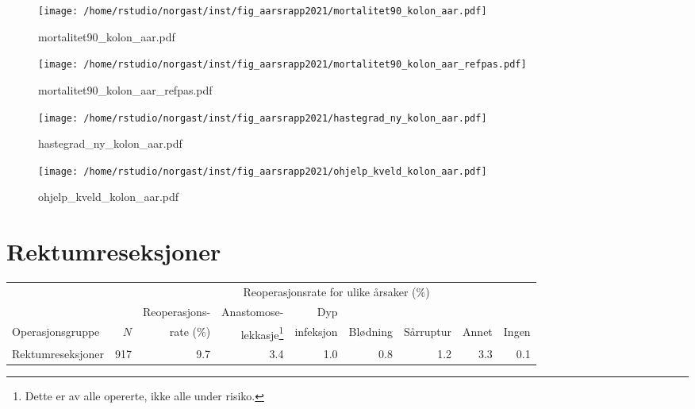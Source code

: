 \documentclass[norsk,a4paper]{article}\usepackage[]{graphicx}\usepackage[]{color}
\begin{document}
\begin{figure}[ht]
\centering
\texttt{[image: /home/rstudio/norgast/inst/fig\_aarsrapp2021/mortalitet90\_kolon\_aar.pdf]}
\caption{mortalitet90\_kolon\_aar.pdf}
\end{figure}

\begin{figure}[ht]
\centering
\texttt{[image: /home/rstudio/norgast/inst/fig\_aarsrapp2021/mortalitet90\_kolon\_aar\_refpas.pdf]}
\caption{mortalitet90\_kolon\_aar\_refpas.pdf}
\end{figure}

\begin{figure}[ht]
\centering
\texttt{[image: /home/rstudio/norgast/inst/fig\_aarsrapp2021/hastegrad\_ny\_kolon\_aar.pdf]}
\caption{hastegrad\_ny\_kolon\_aar.pdf}
\end{figure}

\begin{figure}[ht]
\centering
\texttt{[image: /home/rstudio/norgast/inst/fig\_aarsrapp2021/ohjelp\_kveld\_kolon\_aar.pdf]}
\caption{ohjelp\_kveld\_kolon\_aar.pdf}
\end{figure}

\clearpage

\section{Rektumreseksjoner}

\begin{table}[htb]
\begin{minipage}{\textwidth}
\centering
\begin{tabular}{lrrrrrrrr}
  \toprule
  & & & \multicolumn{4}{c}{Reoperasjonsrate for ulike årsaker (\%)} \\
 \cline{4-9} 
 & & Reoperasjons- & Anastomose- & Dyp &&&&  \\
 Operasjonsgruppe & $N$ & rate (\%) & lekkasje\footnote[2]{Dette er av alle opererte, ikke
alle under risiko.} & infeksjon & Blødning & Sårruptur & Annet & Ingen \\
 \midrule
Rektumreseksjoner & 917 & 9.7 & 3.4 & 1.0 & 0.8 & 1.2 & 3.3 & 0.1 \\ 
   \bottomrule
\end{tabular}

\end{minipage}
\end{table}
\end{document}
